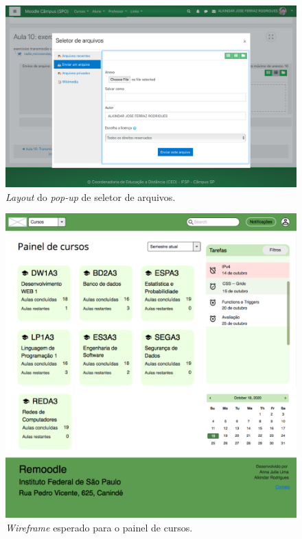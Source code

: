 \documentclass[11pt]{article}
\begin{document}
\begin{figure}[htbp]
\centering
\includegraphics[width=.9\linewidth]{./media/arquivos_2.png}
\caption{\label{fig:orga815c4e}\emph{Layout} do \emph{pop-up} de seletor de arquivos.}
\end{figure}
\begin{figure}[htbp]
\centering
\includegraphics[width=.9\linewidth]{./media/wireframe.png}
\caption{\label{fig:orge13ee2e}\emph{Wireframe} esperado para o painel de cursos.}
\end{figure}
\end{document}
